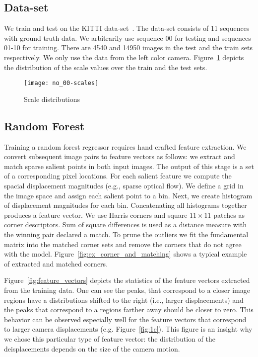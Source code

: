 \subsection{Data-set}

We train and test on the KITTI data-set~\cite{geiger2013vision}.  The
data-set consists of 11 sequences with ground truth data.  We
arbitrarily use sequence 00 for testing and sequences 01-10 for
training.  There are 4540 and 14950 images in the test and the train
sets respectively. We only use the data from the left color camera.
Figure~\ref{fig:scales} depicts the distribution of the scale values
over the train and the test sets.

\begin{figure}[!ht]
  \texttt{[image: no\_00-scales]}
  \caption{Scale distributions}
  \label{fig:scales}
\end{figure}

\subsection{Random Forest}\label{sec:features}

Training a random forest regressor requires hand crafted feature
extraction.  We convert subsequent image pairs to feature vectors as
follows: we extract and match sparse salient points in both input
images.  The output of this stage is a set of a corresponding pixel
locations.  For each salient feature we compute the spacial
displacement magnitudes (e.g., sparse optical flow).  We define a grid
in the image space and assign each salient point to a bin.  Next, we
create histogram of displacement magnitudes for each bin.
Concatenating all histograms together produces a feature vector. We
use Harris corners and square $11\times 11$ patches as corner
descriptors. Sum of square differences is used as a distance measure
with the winning pair declared a match.  To prune the outliers we fit
the fundamental matrix into the matched corner sets and remove the
corners that do not agree with the model.
Figure~\ref{fig:ex_corner_and_matching} shows a typical example of
extracted and matched corners.

Figure~\ref{fig:feature_vectors} depicts the statistics of the feature
vectors extracted from the training data. One can see the peaks, that
correspond to a closer image regions have a distributions shifted to
the right (i.e., larger displacements) and the peaks that correspond
to a regions farther away should be closer to zero.  This behavior can
be observed especially well for the feature vectors that correspond to
larger camera displacements (e.g. Figure~\ref{fig:1c}).  This figure
is an insight why we chose this particular type of feature vector: the
distribution of the deisplacements depends on the size of the camera
motion.

